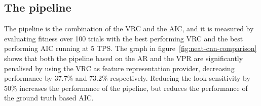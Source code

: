 

\subsection{The pipeline}
\label{sec:pipeline-results}

The pipeline is the combination of the VRC and the AIC, and it is measured by evaluating fitness over 100 trials with the best performing VRC and the best performing AIC running at 5 TPS. The graph in figure~\ref{fig:neat-cnn-comparison} shows that both the pipeline based on the AR and the VPR are significantly penalised by using the VRC as feature representation provider, decreasing performance by 37.7\% and 73.2\% respectively. Reducing the look sensitivity by 50\% increases the performance of the pipeline, but reduces the performance of the ground truth based AIC.




























































